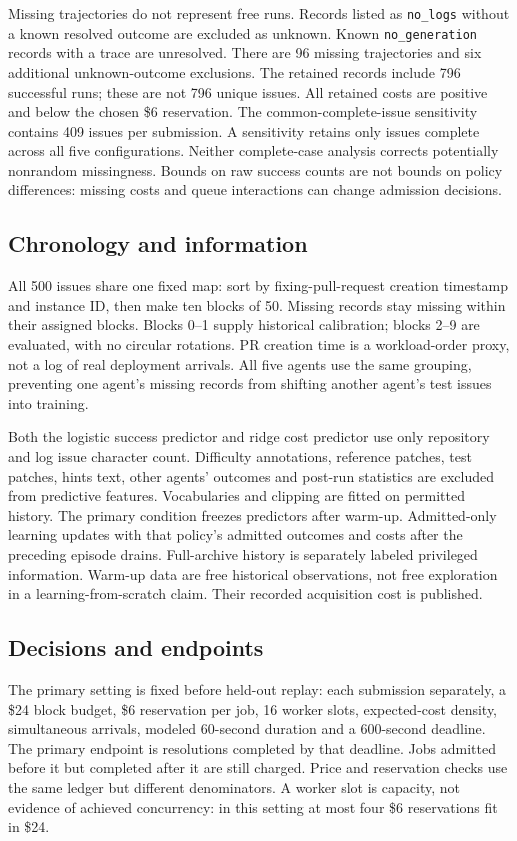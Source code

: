 \documentclass[11pt]{article}
\begin{document}
Missing trajectories do not represent free runs. Records listed as \texttt{no\_logs} without a known resolved outcome are excluded as unknown. Known \texttt{no\_generation} records with a trace are unresolved. There are 96 missing trajectories and six additional unknown-outcome exclusions. The retained records include 796 successful runs; these are not 796 unique issues. All retained costs are positive and below the chosen \$6 reservation. The common-complete-issue sensitivity contains 409 issues per submission. A sensitivity retains only issues complete across all five configurations. Neither complete-case analysis corrects potentially nonrandom missingness. Bounds on raw success counts are not bounds on policy differences: missing costs and queue interactions can change admission decisions.

\subsection{Chronology and information}
All 500 issues share one fixed map: sort by fixing-pull-request creation timestamp and instance ID, then make ten blocks of 50. Missing records stay missing within their assigned blocks. Blocks 0--1 supply historical calibration; blocks 2--9 are evaluated, with no circular rotations. PR creation time is a workload-order proxy, not a log of real deployment arrivals. All five agents use the same grouping, preventing one agent's missing records from shifting another agent's test issues into training.

Both the logistic success predictor and ridge cost predictor use only repository and log issue character count. Difficulty annotations, reference patches, test patches, hints text, other agents' outcomes and post-run statistics are excluded from predictive features. Vocabularies and clipping are fitted on permitted history. The primary condition freezes predictors after warm-up. Admitted-only learning updates with that policy's admitted outcomes and costs after the preceding episode drains. Full-archive history is separately labeled privileged information. Warm-up data are free historical observations, not free exploration in a learning-from-scratch claim. Their recorded acquisition cost is published.

\subsection{Decisions and endpoints}
The primary setting is fixed before held-out replay: each submission separately, a \$24 block budget, \$6 reservation per job, 16 worker slots, expected-cost density, simultaneous arrivals, modeled 60-second duration and a 600-second deadline. The primary endpoint is resolutions completed by that deadline. Jobs admitted before it but completed after it are still charged. Price and reservation checks use the same ledger but different denominators. A worker slot is capacity, not evidence of achieved concurrency: in this setting at most four \$6 reservations fit in \$24.
\end{document}
